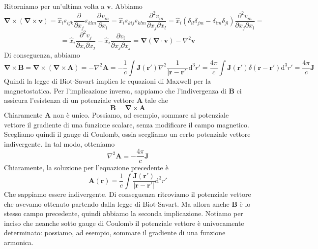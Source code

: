 \documentclass[a4paper,11pt]{book}
\newcommand{\dif}{\mathrm{d}}
\newcommand{\der}[3][]{\frac{\partial ^{#1}#2}{\partial {#3}^{#1}}}
\let\oldnabla\nabla
\renewcommand{\nabla}{\vec{\oldnabla}}
\newcommand{\lap}{\oldnabla^2}
\renewcommand{\vec}[1]{\mathbf{#1}}
\theoremstyle{theorem}
\theoremstyle{definition}
\begin{document}
Ritorniamo per un'ultima volta a $\vec{v}$. Abbiamo
\[\nabla\times(\nabla\times\vec{v})=\hat{x}_i\varepsilon_{ijk}\der{}{x_j}\varepsilon_{klm}\der{v_m}{x_l}=\hat{x}_i\varepsilon_{kij}\varepsilon_{klm}\frac{\partial^2v_m}{\partial x_j\partial x_l}=\hat{x}_i(\delta_{il}\delta_{jm}-\delta_{im}\delta_{jl})\frac{\partial^2v_m}{\partial x_j\partial x_l}=\]\[=\hat{x}_i\frac{\partial^2 v_j}{\partial x_i\partial x_j}-\hat{x}_i\frac{\partial v_i}{\partial x_j\partial x_j}=\nabla(\nabla\cdot\vec{v})-\lap\vec{v}\]
Di conseguenza, abbiamo
\[\nabla\times\vec{B}=\nabla\times(\nabla\times\vec{A})=-\lap\vec{A}=-\frac{1}{c}\int\vec{J}(\vec{r}')\lap\frac{1}{|\vec{r}-\vec{r}'|}\dif^3r'=\frac{4\pi}{c}\int\vec{J}(\vec{r}')\delta(\vec{r}-\vec{r}')\dif^3r'=\frac{4\pi}{c}\vec{J}\]
Quindi la legge di Biot-Savart implica le equazioni di Maxwell per la magnetostatica. Per l'implicazione inversa, sappiamo che l'indivergenza di $\vec{B}$ ci assicura l'esistenza di un potenziale vettore $\vec{A}$ tale che
\[\vec{B}=\nabla\times\vec{A}\]
Chiaramente $\vec{A}$ non è unico. Possiamo, ad esempio, sommare al potenziale vettore il gradiente di una funzione scalare, senza modificare il campo magnetico. Scegliamo quindi il gauge di Coulomb, ossia scegliamo un certo potenziale vettore indivergente. In tal modo, otteniamo
\[\lap\vec{A}=-\frac{4\pi}{c}\vec{J}\]
Chiaramente, la soluzione per l'equazione precedente è
\[\vec{A}(\vec{r})=\frac{1}{c}\int\frac{\vec{J}(\vec{r}')}{|\vec{r}-\vec{r}'|}\dif^3r'\]
Che sappiamo essere indivergente. Di conseguenza ritroviamo il potenziale vettore che avevamo ottenuto partendo dalla legge di Biot-Savart. Ma allora anche $\vec{B}$ è lo stesso campo precedente, quindi abbiamo la seconda implicazione. Notiamo per inciso che neanche sotto gauge di Coulomb il potenziale vettore è univocamente determinato: possiamo, ad esempio, sommare il gradiente di una funzione armonica.
\end{document}
